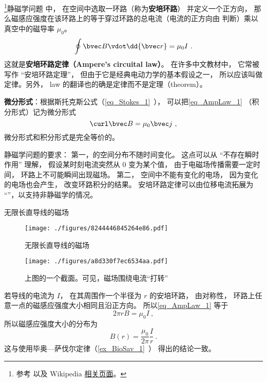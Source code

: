 

\footnote{参考 \cite{GriffE} 以及 Wikipedia \href{https://en.wikipedia.org/wiki/Amp\%C3\%A8re's_circuital_law}{相关页面}。}静磁学问题 %
中， 在空间中选取一环路（称为\textbf{安培环路}） 并定义一个正方向， 那么磁感应强度在该环路上的等于穿过环路的总电流（电流的正方向由 判断）乘以真空中的磁导率 $\mu_0$。
\begin{equation}\label{eq_AmpLaw_1}
\oint \bvec B \vdot \dd{\bvec r} = \mu_0 I~.
\end{equation}
这就是\textbf{安培环路定律（Ampere's circuital law）}。 在许多中文教材中， 它常被写作 “安培环路定理”， 但由于它是经典电动力学的基本假设之一， 所以应该叫做定律。另外， law 的翻译也的确是定律而不是定理（theorem）。

\textbf{微分形式}：根据斯托克斯公式（\autoref{eq_Stokes_1}~）， 可以把\autoref{eq_AmpLaw_1} （积分形式）记为微分形式
\begin{equation}\label{eq_AmpLaw_2}
\curl \bvec B = \mu_0 \bvec j~,
\end{equation}
微分形式和积分形式是完全等价的。

静磁学问题的要求： 第一，的空间分布不随时间变化。 这点可以从 “不存在瞬时作用” 理解， 假设某时刻电流突然从 0 变为某个值， 由于电磁场传播需要一定时间， 环路上不可能瞬间出现磁场。 第二， 空间中不能有变化的电场， 因为变化的电场也会产生， 改变环路积分的结果。 安培环路定律可以由位移电流拓展为 “”，以支持非静磁学的情况。

\begin{example}{无限长直导线的磁场}\label{ex_AmpLaw_1}
\begin{figure}[ht]
\centering
\texttt{[image: ./figures/8244446845264e86.pdf]}
\caption{无限长直导线的磁场} \label{fig_AmpLaw_2}
\end{figure}

\begin{figure}[ht]
\centering
\texttt{[image: ./figures/a8d330f7ec6534aa.pdf]}
\caption{上图的一个截面。可见，磁场围绕电流“打转”} \label{fig_AmpLaw1}
\end{figure}

若导线的电流为 $I$， 在其周围作一个半径为 $r$ 的安培环路， 由对称性， 环路上任意一点的磁感应强度大小相同且沿正方向。 所以\autoref{eq_AmpLaw_1} 等于
\begin{equation}
2\pi r B = \mu_0 I~,
\end{equation}
所以磁感应强度大小的分布为
\begin{equation}
B(r) = \frac{\mu_0}{2\pi} \frac Ir~.
\end{equation}
这与使用毕奥—萨伐尔定律（\autoref{ex_BioSav_1}~） 得出的结论一致。
\end{example}

